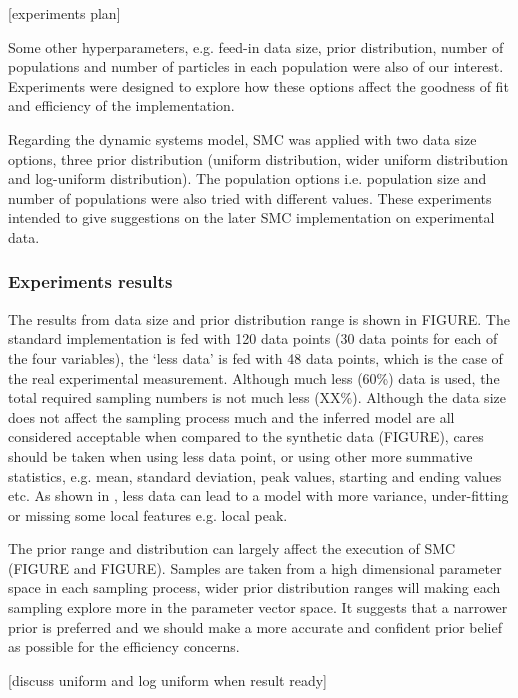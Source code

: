 \documentclass[12pt,a4paper]{report}
\begin{document}
[experiments plan]

Some other hyperparameters, e.g. feed-in data size, prior distribution, number of populations and number of particles in each population were also of our interest. Experiments were designed to explore how these options affect the goodness of fit and efficiency of the implementation.

Regarding the dynamic systems model, SMC was applied with two data size options, three prior distribution (uniform distribution, wider uniform distribution and log-uniform distribution). The population options i.e. population size and number of populations were also tried with different values. These experiments intended to give suggestions on the later SMC implementation on experimental data.

\subsubsection{Experiments results}

The results from data size and prior distribution range is shown in FIGURE. The standard implementation is fed with 120 data points (30 data points for each of the four variables), the `less data' is fed with 48 data points, which is the case of the real experimental measurement. Although much less (60\%) data is used, the total required sampling numbers is not much less (XX\%). Although the data size does not affect the sampling process much and the inferred model are all considered acceptable when compared to the synthetic data (FIGURE), cares should be taken when using less data point, or using other more summative statistics, e.g. mean, standard deviation, peak values, starting and ending values etc. As shown in \cite{ref:disease}, less data can lead to a model with more variance, under-fitting or missing some local features e.g. local peak.

The prior range and distribution can largely affect the execution of SMC (FIGURE and FIGURE). Samples are taken from a high dimensional parameter space in each sampling process, wider prior distribution ranges will making each sampling explore more in the parameter vector space. It suggests that a narrower prior is preferred and we should make a more accurate and confident prior belief as possible for the efficiency concerns.

[discuss uniform and log uniform when result ready]
\end{document}
